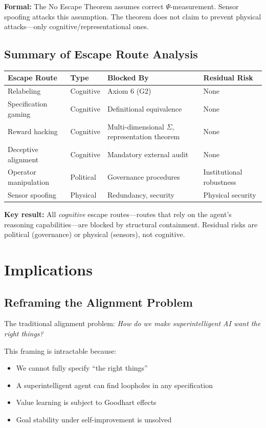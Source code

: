 \documentclass[12pt]{article}
\theoremstyle{definition}
\begin{document}
\textbf{Formal:} The No Escape Theorem assumes correct $\Psi$-measurement. Sensor spoofing attacks this assumption. The theorem does not claim to prevent physical attacks---only cognitive/representational ones.

\subsection{Summary of Escape Route Analysis}

\begin{table}[h]
\centering
\begin{tabular}{@{}llll@{}}
\toprule
Escape Route & Type & Blocked By & Residual Risk \\
\midrule
Relabeling & Cognitive & Axiom 6 (G2) & None \\
Specification gaming & Cognitive & Definitional equivalence & None \\
Reward hacking & Cognitive & Multi-dimensional $\Sigma$, representation theorem & None \\
Deceptive alignment & Cognitive & Mandatory external audit & None \\
Operator manipulation & Political & Governance procedures & Institutional robustness \\
Sensor spoofing & Physical & Redundancy, security & Physical security \\
\bottomrule
\end{tabular}
\end{table}

\textbf{Key result:} All \emph{cognitive} escape routes---routes that rely on the agent's reasoning capabilities---are blocked by structural containment. Residual risks are political (governance) or physical (sensors), not cognitive.

\section{Implications}

\subsection{Reframing the Alignment Problem}

The traditional alignment problem: \emph{How do we make superintelligent AI want the right things?}

This framing is intractable because:
\begin{itemize}
    \item We cannot fully specify ``the right things''
    \item A superintelligent agent can find loopholes in any specification
    \item Value learning is subject to Goodhart effects
    \item Goal stability under self-improvement is unsolved
\end{itemize}
\end{document}
